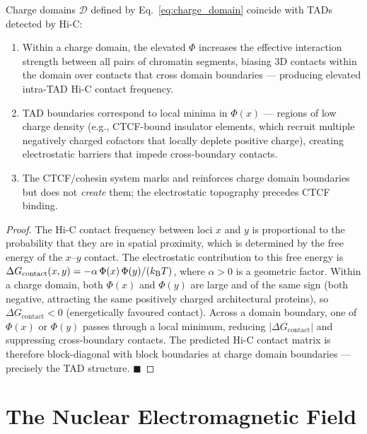\begin{theorem}
\label{thm:tad_charge}
Charge domains $\mathcal{D}$ defined by Eq.~\eqref{eq:charge_domain} coincide
with TADs detected by Hi-C:
\begin{enumerate}[label=(\roman*)]
  \item Within a charge domain, the elevated $\Phi$ increases the effective
        interaction strength between all pairs of chromatin segments, biasing
        3D contacts within the domain over contacts that cross domain
        boundaries --- producing elevated intra-TAD Hi-C contact frequency.
  \item TAD boundaries correspond to local minima in $\Phi(x)$ --- regions of
        low charge density (e.g., CTCF-bound insulator elements, which recruit
        multiple negatively charged cofactors that locally deplete positive
        charge), creating electrostatic barriers that impede cross-boundary
        contacts.
  \item The CTCF/cohesin system marks and reinforces charge domain boundaries
        but does not \emph{create} them; the electrostatic topography precedes
        CTCF binding.
\end{enumerate}
\end{theorem}

\begin{proof}
The Hi-C contact frequency between loci $x$ and $y$ is proportional to the
probability that they are in spatial proximity, which is determined by the
free energy of the $x$--$y$ contact. The electrostatic contribution to this
free energy is
$\Delta G_{\mathrm{contact}}(x,y) = -\alpha\,\Phi(x)\,\Phi(y)/(k_{\mathrm{B}} T)$,
where $\alpha > 0$ is a geometric factor. Within a charge domain, both
$\Phi(x)$ and $\Phi(y)$ are large and of the same sign (both negative,
attracting the same positively charged architectural proteins), so
$\Delta G_{\mathrm{contact}} < 0$ (energetically favoured contact).
Across a domain boundary, one of $\Phi(x)$ or $\Phi(y)$ passes through
a local minimum, reducing $|\Delta G_{\mathrm{contact}}|$ and suppressing
cross-boundary contacts. The predicted Hi-C contact matrix is therefore
block-diagonal with block boundaries at charge domain boundaries --- precisely
the TAD structure. $\blacksquare$
\end{proof}

\section{The Nuclear Electromagnetic Field}
\label{sec:nuclear_em_field}

